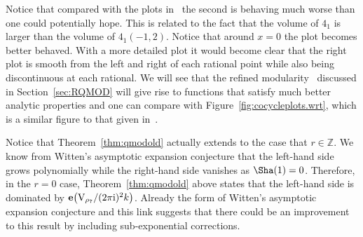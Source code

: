 \documentclass[pdftex]{sigma}
\numberwithin{equation}{section}
\def\BZ{\mathbb{Z}}
\def\e{\mathbf e}
\def\VC{\mathrm{VC}}
\def\WRT{\Sha}
\def\BZ{\mathbb Z}
\def\VC{\mathrm{V}}
\begin{document}
Notice that compared with the plots in~\mbox{\cite[Figures~3 and~4]{Zagier:Qmod}} the second is behaving much worse than one could potentially hope. This is related to the fact that the volume of $4_1$ is larger than the volume of $4_1(-1,2)$. Notice that around $x=0$ the plot becomes better behaved. With a more detailed plot it would become clear that the right plot is smooth from the left and right of each rational point while also being discontinuous at each rational. We will see that the refined modularity~\cite{GZ:RQMOD} discussed in Section~\ref{sec:RQMOD} will give rise to functions that satisfy much better analytic properties and one can compare with Figure~\ref{fig:cocycleplots.wrt}, which is a similar figure to that given in~\cite[Figures~1 and~2]{GZ:RQMOD}.

Notice that Theorem~\ref{thm:qmodold} actually extends to the case that $r\in\BZ$. We know from Witten's asymptotic expansion conjecture that the left-hand side grows polynomially while the right-hand side vanishes as $\WRT(1)=0$. Therefore, in the $r=0$ case, Theorem~\ref{thm:qmodold} above states that the left-hand side is dominated by $\e\bigl(\VC_{\rho_7}/(2\pi {\rm i})^2k\bigr)$. Already the form of Witten's asymptotic expansion conjecture and this link suggests that there could be an improvement to this result by including sub-exponential corrections.
\end{document}
